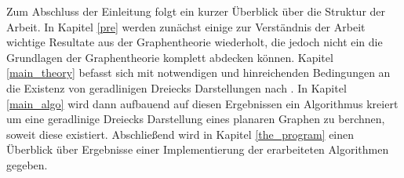 Zum Abschluss der Einleitung folgt ein kurzer Überblick über die Struktur der Arbeit. In Kapitel \ref{pre} werden zunächst einige zur Verständnis der Arbeit wichtige Resultate aus der Graphentheorie wiederholt, die jedoch nicht ein die Grundlagen der Graphentheorie komplett abdecken können. Kapitel \ref{main_theory} befasst sich mit notwendigen und hinreichenden Bedingungen an die Existenz von geradlinigen Dreiecks Darstellungen nach \cite{af13,af15}. In Kapitel \ref{main_algo} wird dann aufbauend auf diesen Ergebnissen ein Algorithmus kreiert um eine geradlinige Dreiecks Darstellung eines planaren Graphen zu berchnen, soweit diese existiert. Abschließend wird in Kapitel \ref{the_program} einen Überblick über Ergebnisse einer Implementierung der erarbeiteten Algorithmen gegeben.